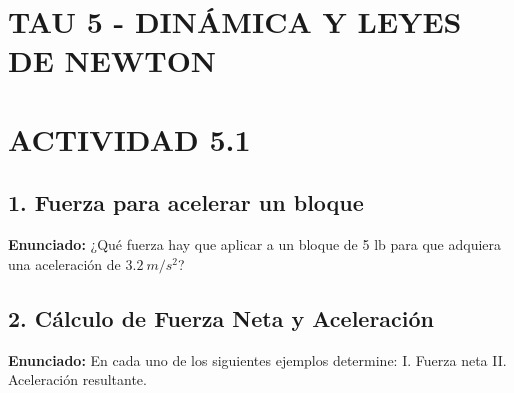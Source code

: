 \documentclass[12pt, letterpaper]{article}
\begin{document}
	\section*{TAU 5 - DINÁMICA Y LEYES DE NEWTON}
	
	\section*{ACTIVIDAD 5.1}
	
	\subsection*{1. Fuerza para acelerar un bloque}
	\noindent \textbf{Enunciado:} ¿Qué fuerza hay que aplicar a un bloque de 5 lb para que adquiera una aceleración de $3.2~m/s^{2}$?
	
	
\subsection*{2. Cálculo de Fuerza Neta y Aceleración}
\noindent \textbf{Enunciado:} En cada uno de los siguientes ejemplos determine: I. Fuerza neta II. Aceleración resultante.
\end{document}
